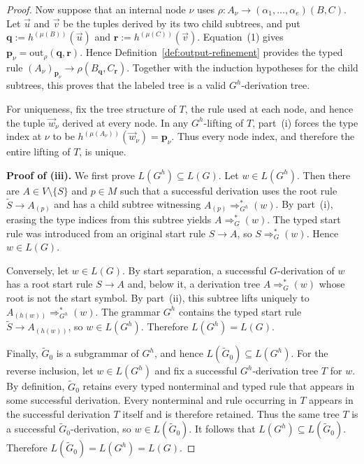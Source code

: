 \documentclass[11pt,a4paper]{article}
\theoremstyle{remark}
\newcommand{\out}{\mathrm{out}}
\newcommand{\tuple}[1]{\vec{#1}}
\begin{document}
\begin{proof}
Now suppose that an internal node \(\nu\) uses
\(\rho\colon A_\nu\to(\alpha_1,\ldots,\alpha_e)(B,C)\).
Let \(\tuple u\) and \(\tuple v\) be the tuples derived by its two child
subtrees, and put \(\mathbf q:=h^{(\mu(B))}(\tuple u)\) and
\(\mathbf r:=h^{(\mu(C))}(\tuple v)\).  Equation~\textup{(1)} gives
\(\mathbf p_\nu=\out_\rho(\mathbf q,\mathbf r)\).  Hence
Definition~\ref{def:output-refinement} provides the typed rule
\((A_\nu)_{\mathbf p_\nu}\to\rho(B_{\mathbf q},C_{\mathbf r})\).
Together with the induction hypotheses for the child subtrees, this proves
that the labeled tree is a valid \(G^h\)-derivation tree.

For uniqueness, fix the tree structure of \(T\), the rule used at each node,
and hence the tuple \(\tuple w_\nu\) derived at every node.  In any
\(G^h\)-lifting of \(T\), part~(i) forces the type index at \(\nu\) to be
\(h^{(\mu(A_\nu))}(\tuple w_\nu)=\mathbf p_\nu\).
Thus every node index, and therefore the entire lifting of \(T\), is unique.

\medskip
\noindent
\textbf{Proof of (iii).}
We first prove \(L(G^h)\subseteq L(G)\).
Let \(w\in L(G^h)\).  Then there are
\(A\in V\setminus\{S\}\) and \(p\in M\) such that a successful derivation
uses the root rule \(\widetilde S\to A_{(p)}\) and has a child subtree
witnessing \(A_{(p)}\Rightarrow_{G^h}^*(w)\).  By part~(i), erasing the type
indices from this subtree yields \(A\Rightarrow_G^*(w)\).  The typed start
rule was introduced from an original start rule \(S\to A\), so
\(S\Rightarrow_G^*(w)\).
Hence \(w\in L(G)\).

Conversely, let \(w\in L(G)\).  By start separation, a successful
\(G\)-derivation of \(w\) has a root start rule \(S\to A\) and, below it, a
derivation tree \(A\Rightarrow_G^*(w)\) whose root is not the start
symbol.  By part~(ii), this subtree lifts uniquely to
\(A_{(h(w))}\Rightarrow_{G^h}^*(w)\).  The grammar \(G^h\) contains the typed
start rule \(\widetilde S\to A_{(h(w))}\), so \(w\in L(G^h)\).  Therefore
\(L(G^h)=L(G)\).

Finally, \(\widetilde G_0\) is a subgrammar of \(G^h\), and hence
\(L(\widetilde G_0)\subseteq L(G^h)\).
For the reverse inclusion, let \(w\in L(G^h)\) and fix a successful
\(G^h\)-derivation tree \(T\) for \(w\).  By definition,
\(\widetilde G_0\) retains every typed nonterminal and typed rule that appears
in some successful derivation.  Every nonterminal and rule occurring in \(T\)
appears in the successful derivation \(T\) itself and is therefore retained.
Thus the same tree \(T\) is a successful \(\widetilde G_0\)-derivation, so
\(w\in L(\widetilde G_0)\).  It follows that
\(L(G^h)\subseteq L(\widetilde G_0)\).  Therefore
\(L(\widetilde G_0)=L(G^h)=L(G)\).
\end{proof}
\end{document}
